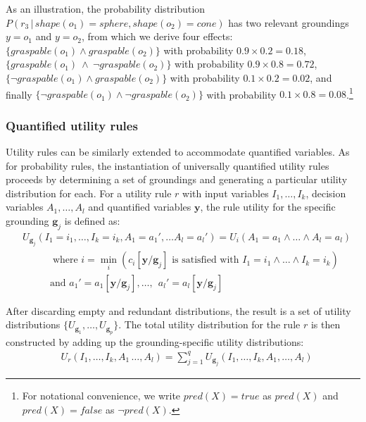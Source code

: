 As an illustration, the probability distribution $P(r_3 \, | \, \mathit{shape}(o_1)\!=\!\mathit{sphere}, \mathit{shape}(o_2)\!=\!\mathit{cone})$ has two relevant groundings $y\!=\!o_1$ and $y\!=\!o_2$, from which we derive four effects: $\{\mathit{graspable}(o_1) \land \mathit{graspable}(o_2) \} $ with probability $0.9\times0.2\!=\!0.18$, $\{\mathit{graspable}(o_1) \ \land \  \lnot\mathit{graspable}(o_2)\}$ with probability $0.9\times0.8\!=\!0.72$, $\{\lnot \mathit{graspable}(o_1) \land \mathit{graspable}(o_2) \}$ with probability $0.1\times0.2\!=\!0.02$, and finally $\{\lnot \mathit{graspable}(o_1) \land \lnot \mathit{graspable}(o_2)\}$ with probability $0.1\times0.8\!=\!0.08$.\footnote{For notational convenience, we write $pred(X)\!=\!true$ as $pred(X)$ and $pred(X)\!=\!false$ as $\lnot pred(X)$.}

\subsubsection*{Quantified utility rules}

Utility rules can be similarly extended to accommodate quantified variables. As for probability rules, the instantiation of universally quantified utility rules proceeds by determining a set of groundings and generating a particular utility distribution for each. 
For a utility rule $r$ with input variables $I_1, \dots, I_k$, decision variables $A_1, \dots, A_l$ and quantified variables $\mathbf{y}$, the rule utility for the specific grounding $\mathbf{g}_j$ is defined as:
 \begin{align}
& U_{\mathbf{g}_j}(I_1\!=\!i_1, \dots, I_k\!=\!i_k, A_1\!=\!a_1', \dots A_l\!=\!a_l') = U_i(A_1\!=\!a_1 \land \dots \land A_l\!=\!a_l) 
 \\
& \; \; \; \; \; \; \; \;   \; \; \;\text{where } i = \min_i (c_i[\mathbf{y} / \mathbf{g}_j]\text{ is satisfied with } I_1\!=\!i_1 \land \dots \land I_k\!=\!i_k) \nonumber \\
& \; \; \; \; \; \; \; \;   \; \;  \text{and } a_1' = a_1[\mathbf{y} / \mathbf{g}_j], \dots, \ \ a_l' = a_l[\mathbf{y} / \mathbf{g}_j] \nonumber
\end{align}

After discarding empty and redundant distributions, the result is a set of utility distributions $ \{ U_{\mathbf{g}_1}, \dots, U_{\mathbf{g}_p} \}$. The total utility distribution for the rule $r$ is then constructed by adding up the grounding-specific utility distributions:   
\begin{align}
& U_{r}(I_1, \dots, I_k, A_1\, \dots, A_l) = \sum_{j=1}^{q} U_{\mathbf{g}_j}(I_1, \dots, I_k, A_1, \dots, A_l) \label{eq:quantifuruledistrib}
\end{align}


